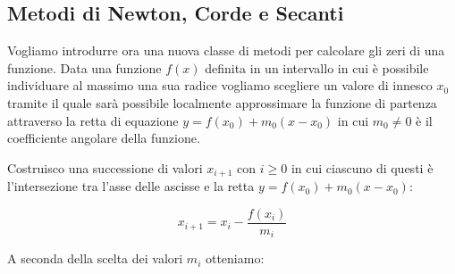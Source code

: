 \documentclass[12pt, a4paper]{book}
\theoremstyle{definition}
\begin{document}
\subsection{Metodi di Newton, Corde e Secanti}
\begin{flushleft}

Vogliamo introdurre ora una nuova classe di metodi per calcolare gli zeri di una funzione. 
Data una funzione $f(x)$ definita in un intervallo in cui è possibile individuare al massimo una sua radice vogliamo scegliere un valore di innesco $x_{0}$ tramite il quale sarà possibile localmente approssimare la funzione di partenza attraverso la retta di equazione $y = f(x_{0}) + m_{0}(x-x_{0})$ in cui $m_{0} \neq 0$ è il coefficiente angolare della funzione.

\begin{figure}[h!]
\centering
{}
\end{figure}

Costruisco una successione di valori $x_{i+1}$ con $i \geq 0$ in cui ciascuno di questi è l'intersezione tra l'asse delle ascisse e 
la retta $y = f(x_{0}) + m_{0}(x-x_{0})$:

\[ 	
	x_{i+1}  = x_{i} - \frac{f(x_{i})}{m_{i}}
\]

A seconda della scelta dei valori $m_{i}$ otteniamo: 


\end{flushleft}
\end{document}
